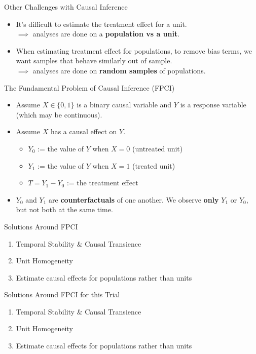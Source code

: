 \documentclass{beamer}
\begin{document}
\begin{frame}{Other Challenges with Causal Inference}
  \begin{itemize}
    \item<+-> It's difficult to estimate the treatment effect for a unit. \\
    \indent $\implies$ analyses are done on a \textbf{population vs a unit}.
    \item<+-> When estimating treatment effect for populations, to remove bias terms, we want samples that behave similarly out of sample. \\
    \indent $\implies$ analyses are done on \textbf{random samples} of populations.
  \end{itemize}
\end{frame}

\begin{frame}{The Fundamental Problem of Causal Inference (FPCI)}
  \begin{itemize}
    \item<+-> Assume $X \in\{0,1\}$ is a binary causal variable and $Y$ is a response variable (which may be continuous).
    \item<+-> Assume $X$ has a causal effect on $Y$.
    \begin{itemize}
      \item $Y_0$ := the value of $Y$ when $X=0$ (untreated unit)
      \item $Y_1$ := the value of $Y$ when $X=1$ (treated unit)
      \item $T = Y_1 - Y_0$ := the treatment effect
    \end{itemize}
    \item<+-> $Y_0$ and $Y_1$ are \textbf{counterfactuals} of one another. We observe \textbf{only} $Y_1$ or $Y_0$, but not both at the same time.
  \end{itemize}
\end{frame}

\begin{frame}{Solutions Around FPCI}
  \begin{enumerate}
    \item<+-> Temporal Stability \& Causal Transience
    \item<+-> Unit Homogeneity
    \item<+-> Estimate causal effects for populations rather than units 
  \end{enumerate}
\end{frame}

\begin{frame}{Solutions Around FPCI for this Trial}
  \begin{enumerate}
    \item Temporal Stability \& Causal Transience {\color{red}{X}}
    \item Unit Homogeneity {\color{red}{X}}
    \item Estimate causal effects for populations rather than units {\color{green}{\checkmark}}
  \end{enumerate}
\end{frame}
\end{document}
